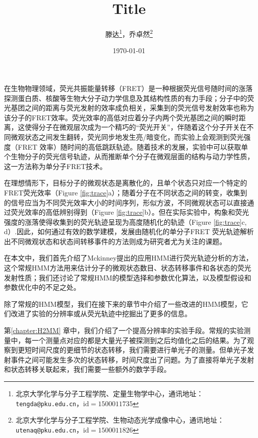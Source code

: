 \documentclass[11pt, a4paper]{article}
\begin{document}
\title{Title}
\author{滕达\footnote{北京大学化学与分子工程学院、定量生物学中心，通讯地址：\texttt{tengda@pku.edu.cn}，$\mathrm{id}=1500011735$}，乔卓然\footnote{北京大学化学与分子工程学院、生物动态光学成像中心，通讯地址：\texttt{utenaq@pku.edu.cn}，$\mathrm{id}=1500011826$}}
\date{\today}

\maketitle

在生物物理领域，荧光共振能量转移（FRET）是一种根据荧光信号随时间的涨落探测蛋白质、核酸等生物大分子动力学信息及其结构性质的有力手段；分子中的荧光基团之间的距离与荧光发射的效率成负相关，采集到的荧光信号发射效率也称为该分子的FRET效率。荧光效率的高低对应着分子内两个荧光基团之间的瞬时距离，这使得分子在微观层次成为一个精巧的“荧光开关”，伴随着这个分子开关在不同微观状态之间发生翻转，荧光同步地发生亮/暗变化，而实验上会观测到荧光强度（FRET 效率）随时间的高低跳跃轨迹。随着技术的发展，实验中可以获取单个生物分子的荧光信号轨迹，从而推断单个分子在微观层面的结构与动力学性质，这一方法称为单分子FRET技术。


在理想情形下，目标分子的微观状态是离散化的，且单个状态只对应一个特定的FRET荧光效率（Figure \ref{fig:trace}a）；随着分子在不同状态之间的转变，收集到的信号应当为不同荧光效率大小的时间序列，形似方波，不同微观状态可以直接通过荧光效率的高低辨别得到（Figure \ref{fig:trace}b）。但在实际实验中，构象和荧光强度的涨落使得收集到的荧光轨迹呈现为高度随机化的轨迹（Figure \ref{fig:trace}c, d）.因此，如何通过有效的数学建模，发展由随机化的单分子FRET 荧光轨迹解析出不同微观状态和状态间转移事件的方法则成为研究者尤为关注的课题。


在本文中，我们首先介绍了Mckinney提出的应用HMM进行荧光轨迹分析的方法，这个常规HMM方法用来估计分子的微观状态数目、状态转移事件和各状态的荧光发射性质；我们还讨论了常规HMM的模型选择和参数优化算法，以及模型假设和参数优化中的不足之处。

除了常规的HMM模型，我们在接下来的章节中介绍了一些改进的HMM模型，它们改进了实验的分辨率或从荧光轨迹中挖掘出了更多的信息。

第\ref{chapter:H2MM} 章中，我们介绍了一个提高分辨率的实验手段。常规的实验测量中，每一个测量点对应的都是大量光子被探测到之后均值化之后的结果。为了观察到更短时间尺度的更细节的状态转移，我们需要进行单光子的测量。但单光子发射事件之间可能发生多次的状态转移，时间尺度出了问题。为了直接将单光子发射和状态转移关联起来，我们需要一些额外的数学手段。
\end{document}
